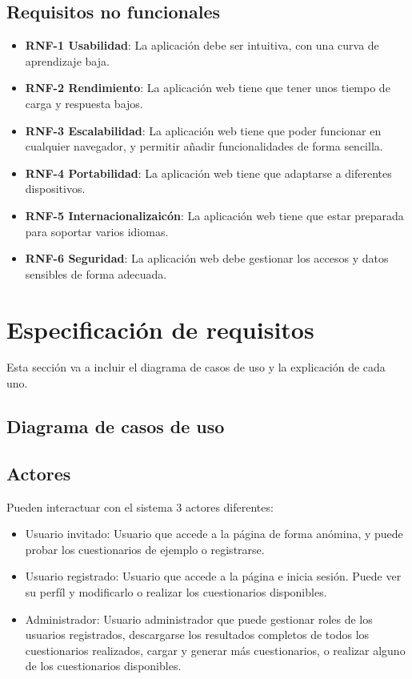 \subsection{Requisitos no funcionales}
\begin{itemize}
	\item \textbf{RNF-1 Usabilidad}: La aplicación debe ser intuitiva, con una curva de aprendizaje baja.
	\item \textbf{RNF-2 Rendimiento}: La aplicación web tiene que tener unos tiempo de carga y respuesta bajos.
	\item \textbf{RNF-3 Escalabilidad}: La aplicación web tiene que poder funcionar en cualquier navegador, y permitir añadir funcionalidades de forma sencilla.
	\item \textbf{RNF-4 Portabilidad}: La aplicación web tiene que adaptarse a diferentes dispositivos.
	\item \textbf{RNF-5 Internacionalizaicón}: La aplicación web tiene que estar preparada para soportar varios idiomas.
	\item \textbf{RNF-6 Seguridad}: La aplicación web debe gestionar los accesos y datos sensibles de forma adecuada.
\end{itemize}

\section{Especificación de requisitos}

Esta sección va a incluir el diagrama de casos de uso y la explicación de cada uno.

\begin{landscape}
\subsection{Diagrama de casos de uso}
\end{landscape}

\subsection{Actores}

Pueden interactuar con el sistema 3 actores diferentes:

\begin{itemize}
	\item Usuario invitado: Usuario que accede a la página de forma anómina, y puede probar los cuestionarios de ejemplo o registrarse.  
	\item Usuario registrado: Usuario que accede a la página e inicia sesión. Puede ver su perfíl y modificarlo o realizar los cuestionarios disponibles.
	\item Administrador: Usuario administrador que puede gestionar roles de los usuarios registrados, descargarse los resultados completos de todos los cuestionarios realizados, cargar y generar más cuestionarios, o realizar alguno de los cuestionarios disponibles.
\end{itemize}

